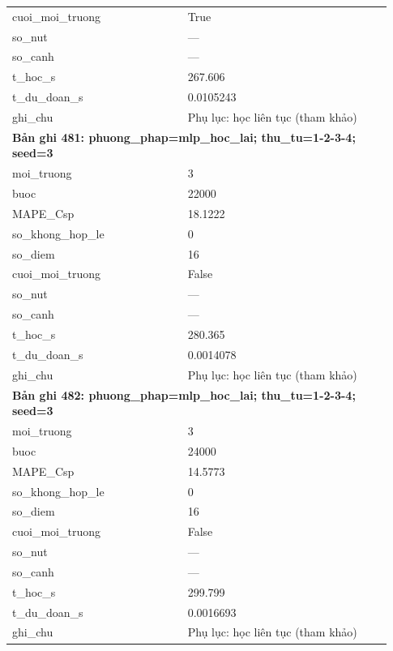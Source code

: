 \begin{longtable}{p{0.43\linewidth}p{0.50\linewidth}}
cuoi\_\allowbreak moi\_\allowbreak truong & True \\
so\_\allowbreak nut & — \\
so\_\allowbreak canh & — \\
t\_\allowbreak hoc\_\allowbreak s & 267.606 \\
t\_\allowbreak du\_\allowbreak doan\_\allowbreak s & 0.0105243 \\
ghi\_\allowbreak chu & Phụ lục: học liên tục (tham khảo) \\
\midrule
\multicolumn{2}{p{0.95\linewidth}}{\textbf{Bản ghi 481: phuong\_phap=mlp\_hoc\_lai; thu\_tu=1-2-3-4; seed=3}} \\
moi\_\allowbreak truong & 3 \\
buoc & 22000 \\
MAPE\_\allowbreak Csp & 18.1222 \\
so\_\allowbreak khong\_\allowbreak hop\_\allowbreak le & 0 \\
so\_\allowbreak diem & 16 \\
cuoi\_\allowbreak moi\_\allowbreak truong & False \\
so\_\allowbreak nut & — \\
so\_\allowbreak canh & — \\
t\_\allowbreak hoc\_\allowbreak s & 280.365 \\
t\_\allowbreak du\_\allowbreak doan\_\allowbreak s & 0.0014078 \\
ghi\_\allowbreak chu & Phụ lục: học liên tục (tham khảo) \\
\midrule
\multicolumn{2}{p{0.95\linewidth}}{\textbf{Bản ghi 482: phuong\_phap=mlp\_hoc\_lai; thu\_tu=1-2-3-4; seed=3}} \\
moi\_\allowbreak truong & 3 \\
buoc & 24000 \\
MAPE\_\allowbreak Csp & 14.5773 \\
so\_\allowbreak khong\_\allowbreak hop\_\allowbreak le & 0 \\
so\_\allowbreak diem & 16 \\
cuoi\_\allowbreak moi\_\allowbreak truong & False \\
so\_\allowbreak nut & — \\
so\_\allowbreak canh & — \\
t\_\allowbreak hoc\_\allowbreak s & 299.799 \\
t\_\allowbreak du\_\allowbreak doan\_\allowbreak s & 0.0016693 \\
ghi\_\allowbreak chu & Phụ lục: học liên tục (tham khảo) \\

\end{longtable}
